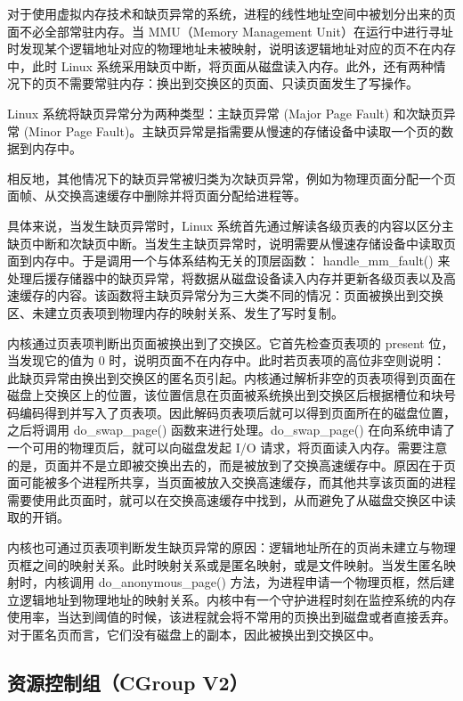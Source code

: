 对于使用虚拟内存技术和缺页异常的系统，进程的线性地址空间中被划分出来的页面不必全部常驻内存。当 MMU（Memory Management Unit）在运行中进行寻址时发现某个逻辑地址对应的物理地址未被映射，说明该逻辑地址对应的页不在内存中，此时 Linux 系统采用缺页中断，将页面从磁盘读入内存。此外，还有两种情况下的页不需要常驻内存：换出到交换区的页面、只读页面发生了写操作。

Linux 系统将缺页异常分为两种类型：主缺页异常 (Major Page Fault) 和次缺页异常 (Minor Page Fault)。主缺页异常是指需要从慢速的存储设备中读取一个页的数据到内存中。

相反地，其他情况下的缺页异常被归类为次缺页异常，例如为物理页面分配一个页面帧、从交换高速缓存中删除并将页面分配给进程等。

具体来说，当发生缺页异常时，Linux 系统首先通过解读各级页表的内容以区分主缺页中断和次缺页中断。当发生主缺页异常时，说明需要从慢速存储设备中读取页面到内存中。于是调用一个与体系结构无关的顶层函数： handle\_mm\_fault() 来处理后援存储器中的缺页异常，将数据从磁盘设备读入内存并更新各级页表以及高速缓存的内容。该函数将主缺页异常分为三大类不同的情况：页面被换出到交换区、未建立页表项到物理内存的映射关系、发生了写时复制。

内核通过页表项判断出页面被换出到了交换区。它首先检查页表项的 present 位，当发现它的值为 0 时，说明页面不在内存中。此时若页表项的高位非空则说明：此缺页异常由换出到交换区的匿名页引起。内核通过解析非空的页表项得到页面在磁盘上交换区上的位置，该位置信息在页面被系统换出到交换区后根据槽位和块号码编码得到并写入了页表项。因此解码页表项后就可以得到页面所在的磁盘位置，之后将调用 do\_swap\_page() 函数来进行处理。do\_swap\_page() 在向系统申请了一个可用的物理页后，就可以向磁盘发起 I/O 请求，将页面读入内存。需要注意的是，页面并不是立即被交换出去的，而是被放到了交换高速缓存中。原因在于页面可能被多个进程所共享，当页面被放入交换高速缓存，而其他共享该页面的进程需要使用此页面时，就可以在交换高速缓存中找到，从而避免了从磁盘交换区中读取的开销。

内核也可通过页表项判断发生缺页异常的原因：逻辑地址所在的页尚未建立与物理页框之间的映射关系。此时映射关系或是匿名映射，或是文件映射。当发生匿名映射时，内核调用 do\_anonymous\_page() 方法，为进程申请一个物理页框，然后建立逻辑地址到物理地址的映射关系。内核中有一个守护进程时刻在监控系统的内存使用率，当达到阈值的时候，该进程就会将不常用的页换出到磁盘或者直接丢弃。对于匿名页而言，它们没有磁盘上的副本，因此被换出到交换区中。

\subsection{资源控制组（CGroup V2）}

